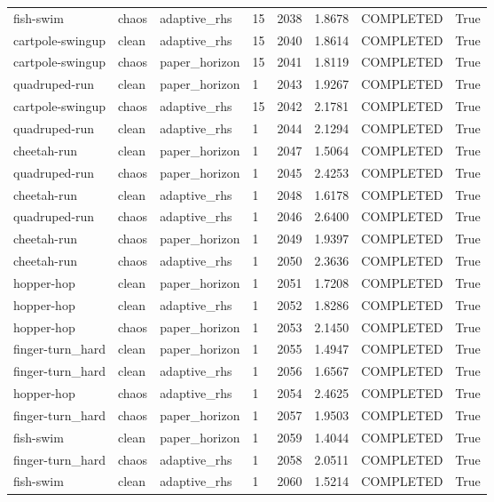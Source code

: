\begin{tabular}{llllllll}
fish-swim & chaos & adaptive\_rhs & 15 & 2038 & 1.8678 & COMPLETED & True \\
cartpole-swingup & clean & adaptive\_rhs & 15 & 2040 & 1.8614 & COMPLETED & True \\
cartpole-swingup & chaos & paper\_horizon & 15 & 2041 & 1.8119 & COMPLETED & True \\
quadruped-run & clean & paper\_horizon & 1 & 2043 & 1.9267 & COMPLETED & True \\
cartpole-swingup & chaos & adaptive\_rhs & 15 & 2042 & 2.1781 & COMPLETED & True \\
quadruped-run & clean & adaptive\_rhs & 1 & 2044 & 2.1294 & COMPLETED & True \\
cheetah-run & clean & paper\_horizon & 1 & 2047 & 1.5064 & COMPLETED & True \\
quadruped-run & chaos & paper\_horizon & 1 & 2045 & 2.4253 & COMPLETED & True \\
cheetah-run & clean & adaptive\_rhs & 1 & 2048 & 1.6178 & COMPLETED & True \\
quadruped-run & chaos & adaptive\_rhs & 1 & 2046 & 2.6400 & COMPLETED & True \\
cheetah-run & chaos & paper\_horizon & 1 & 2049 & 1.9397 & COMPLETED & True \\
cheetah-run & chaos & adaptive\_rhs & 1 & 2050 & 2.3636 & COMPLETED & True \\
hopper-hop & clean & paper\_horizon & 1 & 2051 & 1.7208 & COMPLETED & True \\
hopper-hop & clean & adaptive\_rhs & 1 & 2052 & 1.8286 & COMPLETED & True \\
hopper-hop & chaos & paper\_horizon & 1 & 2053 & 2.1450 & COMPLETED & True \\
finger-turn\_hard & clean & paper\_horizon & 1 & 2055 & 1.4947 & COMPLETED & True \\
finger-turn\_hard & clean & adaptive\_rhs & 1 & 2056 & 1.6567 & COMPLETED & True \\
hopper-hop & chaos & adaptive\_rhs & 1 & 2054 & 2.4625 & COMPLETED & True \\
finger-turn\_hard & chaos & paper\_horizon & 1 & 2057 & 1.9503 & COMPLETED & True \\
fish-swim & clean & paper\_horizon & 1 & 2059 & 1.4044 & COMPLETED & True \\
finger-turn\_hard & chaos & adaptive\_rhs & 1 & 2058 & 2.0511 & COMPLETED & True \\
fish-swim & clean & adaptive\_rhs & 1 & 2060 & 1.5214 & COMPLETED & True \\

\end{tabular}
